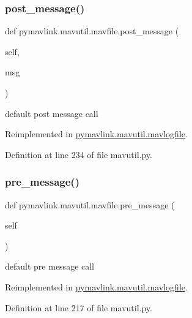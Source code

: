 \subsubsection{\texorpdfstring{post\_message()}{post\_message()}}
{\footnotesize\ttfamily def pymavlink.\+mavutil.\+mavfile.\+post\+\_\+message (\begin{DoxyParamCaption}\item[{}]{self,  }\item[{}]{msg }\end{DoxyParamCaption})}

\begin{DoxyVerb}default post message call\end{DoxyVerb}
 

Reimplemented in \mbox{\hyperlink{classpymavlink_1_1mavutil_1_1mavlogfile_ac304637b0b24999e12763ccbc59a2085}{pymavlink.\+mavutil.\+mavlogfile}}.



Definition at line 234 of file mavutil.\+py.

\mbox{\label{classpymavlink_1_1mavutil_1_1mavfile_ad0ea96f4450b27d0327d9060d55e05be}} 
\subsubsection{\texorpdfstring{pre\_message()}{pre\_message()}}
{\footnotesize\ttfamily def pymavlink.\+mavutil.\+mavfile.\+pre\+\_\+message (\begin{DoxyParamCaption}\item[{}]{self }\end{DoxyParamCaption})}

\begin{DoxyVerb}default pre message call\end{DoxyVerb}
 

Reimplemented in \mbox{\hyperlink{classpymavlink_1_1mavutil_1_1mavlogfile_ad3bd6ab83073f82be56c6d393e6ea6c3}{pymavlink.\+mavutil.\+mavlogfile}}.



Definition at line 217 of file mavutil.\+py.

\mbox{\label{classpymavlink_1_1mavutil_1_1mavfile_aa3ceb80a2e7c62fdfc87c27c278261b9}} 

